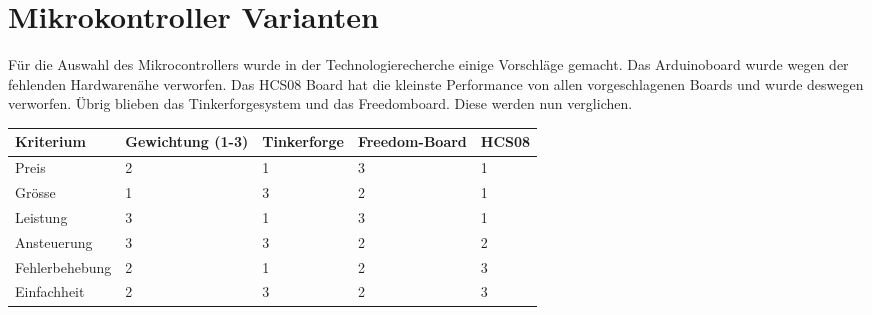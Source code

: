 \section{Mikrokontroller Varianten}

Für die Auswahl des Mikrocontrollers wurde in der Technologierecherche einige Vorschläge gemacht. Das Arduinoboard wurde wegen der fehlenden Hardwarenähe verworfen. Das HCS08 Board hat die kleinste Performance von allen vorgeschlagenen Boards und wurde deswegen verworfen.
Übrig blieben das Tinkerforgesystem und das Freedomboard. Diese werden nun verglichen.
\begin{table}[h]
\begin{tabular}{|p{4.5cm}|p{3.5cm}|p{2cm}|p{2cm}|p{2cm}|}\hline
	
	\textbf{Kriterium}	& 	\textbf{Gewichtung (1-3)} & \textbf{Tinkerforge} & \textbf{Freedom-Board} & \textbf{HCS08}\\\hline
	{Preis}	& 	{2} & {1} & {3} & {1}\\\hline
	{Grösse}	& 	{1} & {3} & {2} & {1}\\\hline
	{Leistung}	& 	{3} & {1} & {3} & {1}\\\hline
	{Ansteuerung}	& 	{3} & {3} & {2} & {2}\\\hline
	{Fehlerbehebung}	& 	{2} & {1} & {2} & {3}\\\hline
	{Einfachheit}	& 	{2} & {3} & {2} & {3}\\\hline	
	
	
	
\end{tabular}\\
\end{table}